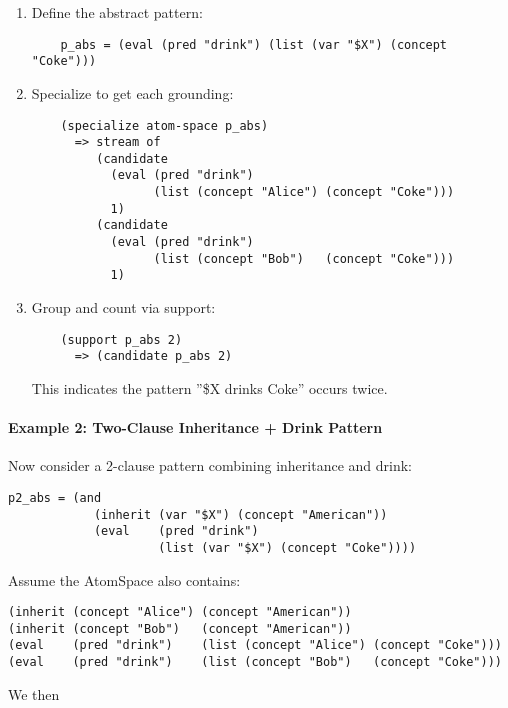 \documentclass{article}
\begin{document}
\begin{enumerate}
\item  Define the abstract pattern:
    \begin{verbatim}
    p_abs = (eval (pred "drink") (list (var "$X") (concept "Coke")))
    \end{verbatim}

\item  Specialize to get each grounding:
    \begin{verbatim}
    (specialize atom-space p_abs)
      => stream of
         (candidate
           (eval (pred "drink")
                 (list (concept "Alice") (concept "Coke")))
           1)
         (candidate
           (eval (pred "drink")
                 (list (concept "Bob")   (concept "Coke")))
           1)
    \end{verbatim}

\item   Group and count via support:
    \begin{verbatim}
    (support p_abs 2)
      => (candidate p_abs 2)
    \end{verbatim}
    This indicates the pattern ''\$X drinks Coke'' occurs twice.
\end{enumerate}

\paragraph{Example 2: Two-Clause Inheritance + Drink Pattern}

Now consider a 2-clause pattern combining inheritance and drink:

\begin{verbatim}
p2_abs = (and
            (inherit (var "$X") (concept "American"))
            (eval    (pred "drink")
                     (list (var "$X") (concept "Coke"))))
\end{verbatim}

Assume the AtomSpace also contains:
\begin{verbatim}
(inherit (concept "Alice") (concept "American"))
(inherit (concept "Bob")   (concept "American"))
(eval    (pred "drink")    (list (concept "Alice") (concept "Coke")))
(eval    (pred "drink")    (list (concept "Bob")   (concept "Coke")))
\end{verbatim}

We then
\end{document}
